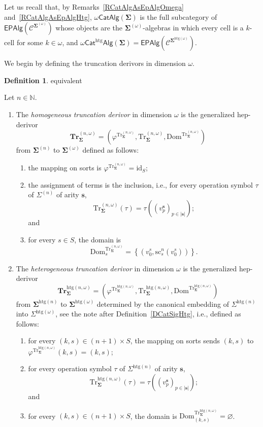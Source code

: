 \documentclass[a4paper, reqno]{amsbook}
\makeatletter
\newcommand{\bb}[1]{\ensuremath{\lvert #1 \rvert}}
\newcommand{\sig}[1]{\mathbf{#1}}             %
\newcommand{\spec}[1]{\boldsymbol{\mathcal{#1}}} %
\newcommand{\Dom}{\mathrm{Dom}}
\newcommand{\htg}{\mathrm{htg}}                %
\newcommand{\id}{\mathrm{id}}
\newcommand{\src}{\mathrm{sc}}
\newcommand{\Tr}{\mathrm{Tr}}
\newcommand{\bTr}{\mathbf{Tr}}
\theoremstyle{plain}
\theoremstyle{definition}
\newtheorem{definition}[theorem]{Definition}
\newcommand*{\CA@leanpending}{}
\newcommand*{\CA@leanrelation}{}
\newcommand*{\lean}[2]{%
  \ifcsname\string\color@lean@#1\endcsname\else
    \PackageError{main}{Unknown relation `#1' in \string\lean}{Use equivalent, weaker or stronger.}%
  \fi
  \gdef\CA@leanrelation{#1}%
  \gdef\CA@leanpending{#2}}
\makeatother
\begin{document}
Let us recall that, by Remarks~\ref{RCatAlgAsEpAlgOmega} and~\ref{RCatAlgAsEpAlgHtg}, $\omega\mathsf{CatAlg}(\sig{\Sigma})$ is the full subcategory of $\mathsf{EPAlg}(\spec{C}^{\sig{\Sigma}^{(\omega)}})$ whose objects are the $\sig{\Sigma}^{(\omega)}$-algebras in which every cell is a $k$-cell for some $k\in\omega$, and $\omega\mathsf{Cat}^{\htg}\mathsf{Alg}(\sig{\Sigma})=\mathsf{EPAlg}(\spec{C}^{\sig{\Sigma}^{\htg(\omega)}})$.

We begin by defining the truncation derivors in dimension $\omega$.

\begin{definition}\label{DTrDerivorOmega}\lean{equivalent}{Dimensions.homogeneousOmegaTruncation,Dimensions.heterogeneousOmegaTruncation}
Let $n\in\mathbb{N}$.
\begin{enumerate}
\item The \emph{homogeneous truncation derivor} in dimension $\omega$ is the generalized hep-derivor
$$
\bTr^{(n,\omega)}_{\sig{\Sigma}}=\left(\varphi^{\Tr^{(n,\omega)}_{\sig{\Sigma}}},\Tr^{(n,\omega)}_{\sig{\Sigma}},\Dom^{\Tr^{(n,\omega)}_{\sig{\Sigma}}}\right)
$$
from $\sig{\Sigma}^{(n)}$ to $\sig{\Sigma}^{(\omega)}$ defined as follows:
\begin{enumerate}
\item the mapping on sorts is $\varphi^{\Tr^{(n,\omega)}_{\sig{\Sigma}}}=\id_{S}$;
\item the assignment of terms is the inclusion, i.e., for every operation symbol $\tau$ of $\Sigma^{(n)}$ of arity $\mathbf{s}$,
$$
\Tr^{(n,\omega)}_{\sig{\Sigma}}(\tau)=\tau((v^{\mathbf{s}}_{p})_{p\in\bb{\mathbf{s}}});
$$
and
\item for every $s\in S$, the domain is
$$
\Dom^{\Tr^{(n,\omega)}_{\sig{\Sigma}}}_{s}=\left\lbrace\left(v^{s}_{0},\src^{n}_{s}(v^{s}_{0})\right)\right\rbrace.
$$
\end{enumerate}
\item The \emph{heterogeneous truncation derivor} in dimension $\omega$ is the generalized hep-derivor
$$
\bTr^{\htg(n,\omega)}_{\sig{\Sigma}}=\left(\varphi^{\Tr^{\htg(n,\omega)}_{\sig{\Sigma}}},\Tr^{\htg(n,\omega)}_{\sig{\Sigma}},\Dom^{\Tr^{\htg(n,\omega)}_{\sig{\Sigma}}}\right)
$$
from $\sig{\Sigma}^{\htg(n)}$ to $\sig{\Sigma}^{\htg(\omega)}$ determined by the canonical embedding of $\Sigma^{\htg(n)}$ into $\Sigma^{\htg(\omega)}$, see the note after Definition~\ref{DCatSigHtg}, i.e., defined as follows:
\begin{enumerate}
\item for every $(k,s)\in(n+1)\times S$, the mapping on sorts sends $(k,s)$ to $\varphi^{\Tr^{\htg(n,\omega)}_{\sig{\Sigma}}}(k,s)=(k,s)$;
\item for every operation symbol $\tau$ of $\Sigma^{\htg(n)}$ of arity $\mathbf{s}$,
$$
\Tr^{\htg(n,\omega)}_{\sig{\Sigma}}(\tau)=\tau((v^{\mathbf{s}}_{p})_{p\in\bb{\mathbf{s}}});
$$
and
\item for every $(k,s)\in(n+1)\times S$, the domain is $\Dom^{\Tr^{\htg(n,\omega)}_{\sig{\Sigma}}}_{(k,s)}=\varnothing$.
\end{enumerate}
\end{enumerate}
\end{definition}
\end{document}
